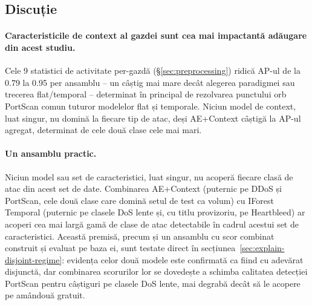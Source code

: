 \subsection{Discuție}

\paragraph{Caracteristicile de context al gazdei sunt cea mai impactantă adăugare din acest studiu.} Cele 9 statistici de activitate per-gazdă (\S\ref{sec:preprocessing}) ridică AP-ul de la 0.79 la 0.95 per ansamblu -- un câștig mai mare decât alegerea paradigmei sau trecerea flat/temporal -- determinat în principal de rezolvarea punctului orb PortScan comun tuturor modelelor flat și temporale. Niciun model de context, luat singur, nu domină la fiecare tip de atac, deși AE+Context câștigă la AP-ul agregat, determinat de cele două clase cele mai mari.

\paragraph{Un ansamblu practic.} Niciun model sau set de caracteristici, luat singur, nu acoperă fiecare clasă de atac din acest set de date. Combinarea AE+Context (puternic pe DDoS și PortScan, cele două clase care domină setul de test ca volum) cu IForest Temporal (puternic pe clasele DoS lente și, cu titlu provizoriu, pe Heartbleed) ar acoperi cea mai largă gamă de clase de atac detectabile în cadrul acestui set de caracteristici. Această premisă, precum și un ansamblu cu scor combinat construit și evaluat pe baza ei, sunt testate direct în secțiunea~\ref{sec:explain-disjoint-regime}: evidența celor două modele este confirmată ca fiind cu adevărat disjunctă, dar combinarea scorurilor lor se dovedește a schimba calitatea detecției PortScan pentru câștiguri pe clasele DoS lente, mai degrabă decât să le acopere pe amândouă gratuit.